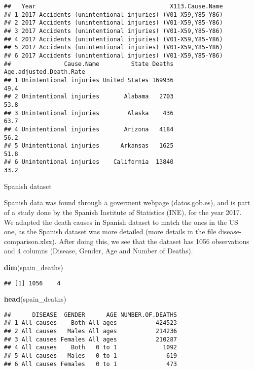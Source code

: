 \documentclass[]{article}
\newenvironment{Shaded}{\begin{snugshade}}{\end{snugshade}}
\newcommand{\KeywordTok}[1]{\textcolor[rgb]{0.13,0.29,0.53}{\textbf{#1}}}
\newcommand{\NormalTok}[1]{#1}
\begin{document}
\begin{verbatim}
##   Year                                      X113.Cause.Name
## 1 2017 Accidents (unintentional injuries) (V01-X59,Y85-Y86)
## 2 2017 Accidents (unintentional injuries) (V01-X59,Y85-Y86)
## 3 2017 Accidents (unintentional injuries) (V01-X59,Y85-Y86)
## 4 2017 Accidents (unintentional injuries) (V01-X59,Y85-Y86)
## 5 2017 Accidents (unintentional injuries) (V01-X59,Y85-Y86)
## 6 2017 Accidents (unintentional injuries) (V01-X59,Y85-Y86)
##               Cause.Name         State Deaths Age.adjusted.Death.Rate
## 1 Unintentional injuries United States 169936                    49.4
## 2 Unintentional injuries       Alabama   2703                    53.8
## 3 Unintentional injuries        Alaska    436                    63.7
## 4 Unintentional injuries       Arizona   4184                    56.2
## 5 Unintentional injuries      Arkansas   1625                    51.8
## 6 Unintentional injuries    California  13840                    33.2
\end{verbatim}

Spanish dataset

Spanish data was found through a goverment webpage (datos.gob.es), and
is part of a study done by the Spanish Institute of Statistics (INE),
for the year 2017. We adapted the death causes in Spanish dataset to
match the ones in the US one, as the Spanish dataset was more detailed
(more details in the file disease-comparison.xlsx). After doing this, we
see that the dataset has 1056 observations and 4 columns (Disease,
Gender, Age and Number of Deaths).

\begin{Shaded}
\begin{Highlighting}[]
\KeywordTok{dim}\NormalTok{(spain_deaths)}
\end{Highlighting}
\end{Shaded}

\begin{verbatim}
## [1] 1056    4
\end{verbatim}

\begin{Shaded}
\begin{Highlighting}[]
\KeywordTok{head}\NormalTok{(spain_deaths)}
\end{Highlighting}
\end{Shaded}

\begin{verbatim}
##      DISEASE  GENDER      AGE NUMBER.OF.DEATHS
## 1 All causes    Both All ages           424523
## 2 All causes   Males All ages           214236
## 3 All causes Females All ages           210287
## 4 All causes    Both   0 to 1             1092
## 5 All causes   Males   0 to 1              619
## 6 All causes Females   0 to 1              473
\end{verbatim}
\end{document}

